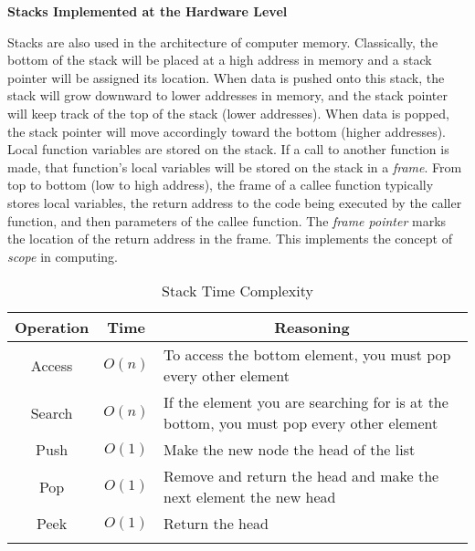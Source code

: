 \begin{tcolorbox}[enhanced, colback=textbook-blue, sharp corners]
	\vspace{2mm}
	\begin{center}
		\textbf{Stacks Implemented at the Hardware Level}
	\end{center}
	\vspace{1mm}
	Stacks are also used in the architecture of computer memory. Classically, the bottom of the stack will be placed at a high address in memory and a stack pointer will be assigned its location. When data is pushed onto this stack, the stack will grow downward to lower addresses in memory, and the stack pointer will keep track of the top of the stack (lower addresses). When data is popped, the stack pointer will move accordingly toward the bottom (higher addresses). \\
	
	Local function variables are stored on the stack. If a call to another function is made, that function's local variables will be stored on the stack in a \textit{frame}. From top to bottom (low to high address), the frame of a callee function typically stores local variables, the return address to the code being executed by the caller function, and then parameters of the callee function. The \textit{frame pointer} marks the location of the return address in the frame. This implements the concept of \textit{scope} in computing. \\
\end{tcolorbox}
\vspace{7mm}

\begin{table}[H]
	\caption{Stack Time Complexity}
	\label{tab:stack}
	\begin{tabularx}{\textwidth}{|c|c|X|}
		\vtabularspace{3}
		\hline
		Operation & Time & \multicolumn{1}{c|}{Reasoning} \\
		\hline
		Access & $O(n)$ & To access the bottom element, you must pop every other element \\
		Search & $O(n)$ & If the element you are searching for is at the bottom, you must pop every other element  \\
		\hline
		\hline
		Push & $O(1)$ & Make the new node the head of the list \\
		Pop & $O(1)$ & Remove and return the head and make the next element the new head \\
		Peek & $O(1)$ & Return the head \\
		\hline
		\vtabularspace{3}
	\end{tabularx}
\end{table}


